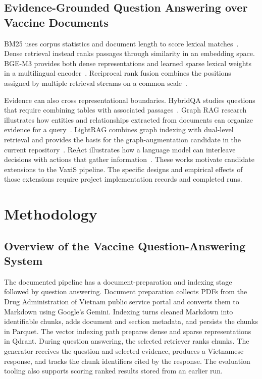 \documentclass[oneside]{sn-jnl}
\begin{document}
\subsection{Evidence-Grounded Question Answering over Vaccine Documents}
BM25 uses corpus statistics and document length to score lexical matches~\cite{robertson2009bm25}. Dense retrieval instead ranks passages through similarity in an embedding space. BGE-M3 provides both dense representations and learned sparse lexical weights in a multilingual encoder~\cite{chen2024m3}. Reciprocal rank fusion combines the positions assigned by multiple retrieval streams on a common scale~\cite{cormack2009rrf}.

Evidence can also cross representational boundaries. HybridQA studies questions that require combining tables with associated passages~\cite{chen2020hybridqa}. Graph RAG research illustrates how entities and relationships extracted from documents can organize evidence for a query~\cite{edge2024graphrag}. LightRAG combines graph indexing with dual-level retrieval and provides the basis for the graph-augmentation candidate in the current repository~\cite{guo2024lightrag}. ReAct illustrates how a language model can interleave decisions with actions that gather information~\cite{yao2023react}. These works motivate candidate extensions to the VaxiS pipeline. The specific designs and empirical effects of those extensions require project implementation records and completed runs.

\section{Methodology}

\subsection{Overview of the Vaccine Question-Answering System}
The documented pipeline has a document-preparation and indexing stage followed by question answering. Document preparation collects PDFs from the Drug Administration of Vietnam public service portal and converts them to Markdown using Google's Gemini. Indexing turns cleaned Markdown into identifiable chunks, adds document and section metadata, and persists the chunks in Parquet. The vector indexing path prepares dense and sparse representations in Qdrant. During question answering, the selected retriever ranks chunks. The generator receives the question and selected evidence, produces a Vietnamese response, and tracks the chunk identifiers cited by the response. The evaluation tooling also supports scoring ranked results stored from an earlier run.
\end{document}
